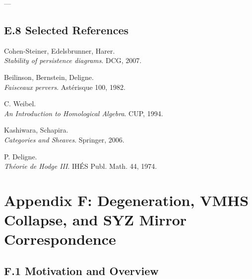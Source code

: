 \documentclass[11pt]{article}
\begin{document}
\begin{center}
\end{center}

---

\subsection*{E.8 Selected References}

\begin{thebibliography}{9}

Cohen-Steiner, Edelsbrunner, Harer.\\
\textit{Stability of persistence diagrams}. DCG, 2007.

Beilinson, Bernstein, Deligne.\\
\textit{Faisceaux pervers}. Astérisque 100, 1982.

C. Weibel.\\
\textit{An Introduction to Homological Algebra}. CUP, 1994.

Kashiwara, Schapira.\\
\textit{Categories and Sheaves}. Springer, 2006.

P. Deligne.\\
\textit{Théorie de Hodge III}. IHÉS Publ. Math. 44, 1974.

\end{thebibliography}



\section*{Appendix F: Degeneration, VMHS Collapse, and SYZ Mirror Correspondence}

\subsection*{F.1 Motivation and Overview}
\end{document}
